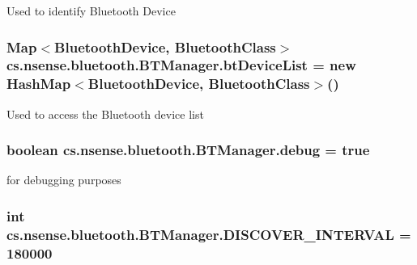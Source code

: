 Used to identify Bluetooth Device \hypertarget{classcs_1_1nsense_1_1bluetooth_1_1_b_t_manager_afc03906b5d9d0e6fe8a946c45abd4eef}{
\subsubsection[{bt\-Device\-List}]{\setlength{\rightskip}{0pt plus 5cm}Map$<$Bluetooth\-Device, Bluetooth\-Class$>$ cs.\-nsense.\-bluetooth.\-B\-T\-Manager.\-bt\-Device\-List = new Hash\-Map$<$Bluetooth\-Device, Bluetooth\-Class$>$()\hspace{0.3cm}{\ttfamily [private]}}}\label{classcs_1_1nsense_1_1bluetooth_1_1_b_t_manager_afc03906b5d9d0e6fe8a946c45abd4eef}
Used to access the Bluetooth device list \hypertarget{classcs_1_1nsense_1_1bluetooth_1_1_b_t_manager_a1ca2bd8b9421df0d4b4e706c184c1a2c}{
\subsubsection[{debug}]{\setlength{\rightskip}{0pt plus 5cm}boolean cs.\-nsense.\-bluetooth.\-B\-T\-Manager.\-debug = true\hspace{0.3cm}{\ttfamily [private]}}}\label{classcs_1_1nsense_1_1bluetooth_1_1_b_t_manager_a1ca2bd8b9421df0d4b4e706c184c1a2c}
for debugging purposes \hypertarget{classcs_1_1nsense_1_1bluetooth_1_1_b_t_manager_afb7cff448099f40f32c19b57e43e762a}{
\subsubsection[{D\-I\-S\-C\-O\-V\-E\-R\-\_\-\-I\-N\-T\-E\-R\-V\-A\-L}]{\setlength{\rightskip}{0pt plus 5cm}int cs.\-nsense.\-bluetooth.\-B\-T\-Manager.\-D\-I\-S\-C\-O\-V\-E\-R\-\_\-\-I\-N\-T\-E\-R\-V\-A\-L = 180000\hspace{0.3cm}{\ttfamily [static]}}}\label{classcs_1_1nsense_1_1bluetooth_1_1_b_t_manager_afb7cff448099f40f32c19b57e43e762a}
